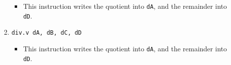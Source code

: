 \documentclass{article}
\begin{document}
\begin{itemize}
\begin{enumerate}
\begin{itemize}
				\item This instruction writes the quotient into
					\texttt{dA}, and the remainder into \texttt{dD}.
				\end{itemize}
			\item \texttt{div.v dA, dB, dC, dD}
				\begin{itemize}
				\item This instruction writes the quotient into
					\texttt{dA}, and the remainder into \texttt{dD}.
				\end{itemize}
			\end{enumerate}
		\end{itemize}
		\newpage
\end{document}
